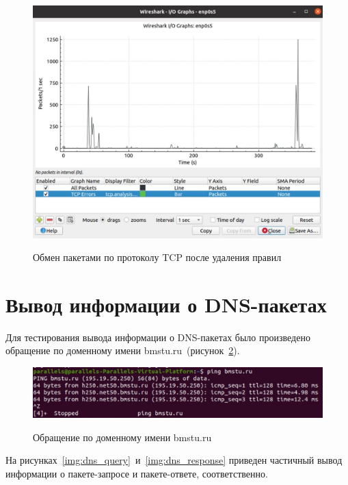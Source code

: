 \begin{figure}[h!]
	\begin{center}
		{\includegraphics[scale = 0.3]{inc/img/tcp_after.jpg}}
		\caption{Обмен пакетами по протоколу TCP после удаления правил}
		\label{img:tcp_after}
	\end{center}
\end{figure}



\section{Вывод информации о DNS-пакетах}

Для тестирования вывода информации о DNS-пакетах было произведено обращение по доменному имени bmstu.ru~(рисунок~\ref{img:dns_bmstu}). 

\clearpage
\begin{figure}[h!]
	\begin{center}
		{\includegraphics[scale = 0.3]{inc/img/dns_bmstu.jpg}}
		\caption{Обращение по доменному имени bmstu.ru}
		\label{img:dns_bmstu}
	\end{center}
\end{figure}


На рисунках~\ref{img:dns_query}~и~\ref{img:dns_response} приведен частичный вывод информации о пакете-запросе и пакете-ответе, соответственно.


